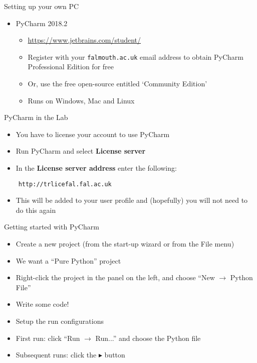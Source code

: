 \begin{frame}{Setting up your own PC}
\begin{itemize}
\item PyCharm 2018.2
\begin{itemize}
	\item \url{https://www.jetbrains.com/student/}
	\item Register with your \texttt{falmouth.ac.uk} email address to obtain PyCharm Professional Edition for free
	\item Or, use the free open-source entitled `Community Edition'
	\item Runs on Windows, Mac and Linux
\end{itemize}
\end{itemize}
\end{frame}

\begin{frame}[fragile]{PyCharm in the Lab}
	\begin{itemize}
		\item You have to license your account to use PyCharm
		\item Run PyCharm and select \textbf{License server}
		\item In the \textbf{License server address} enter the following:
	\end{itemize} 
	 \begin{lstlisting}
	http://trlicefal.fal.ac.uk
 	\end{lstlisting}
	\begin{itemize}
		\item This will be added to your user profile and (hopefully) you will not need to do this again
	\end{itemize} 
\end{frame}

\begin{frame}{Getting started with PyCharm}
\begin{itemize}
\item Create a new project (from the start-up wizard or from the File menu)
\item We want a ``Pure Python'' project
\item Right-click the project in the panel on the left, and choose ``New $\to$ Python File''
\item Write some code!
\item Setup the run configurations
\item First run: click ``Run $\to$ Run...'' and choose the Python file
\item Subsequent runs: click the $\blacktriangleright$ button
\end{itemize}
\end{frame}


